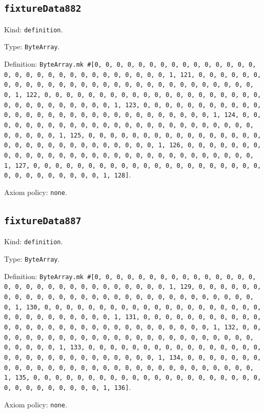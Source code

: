 \documentclass[11pt]{article}
\begin{document}
\subsection*{\texttt{fixtureData882}}
\noindent Kind: \texttt{definition}.\par
\noindent Type: \texttt{ByteArray}.\par
\noindent Definition: \texttt{ByteArray.mk \#[0, 0, 0, 0, 0, 0, 0, 0, 0, 0, 0, 0, 0, 0, 0, 0, 0, 0, 0, 0, 0, 0, 0, 0, 0, 0, 0, 0, 0, 0, 1, 121, 0, 0, 0, 0, 0, 0, 0, 0, 0, 0, 0, 0, 0, 0, 0, 0, 0, 0, 0, 0, 0, 0, 0, 0, 0, 0, 0, 0, 0, 0, 1, 122, 0, 0, 0, 0, 0, 0, 0, 0, 0, 0, 0, 0, 0, 0, 0, 0, 0, 0, 0, 0, 0, 0, 0, 0, 0, 0, 0, 0, 0, 0, 1, 123, 0, 0, 0, 0, 0, 0, 0, 0, 0, 0, 0, 0, 0, 0, 0, 0, 0, 0, 0, 0, 0, 0, 0, 0, 0, 0, 0, 0, 0, 0, 1, 124, 0, 0, 0, 0, 0, 0, 0, 0, 0, 0, 0, 0, 0, 0, 0, 0, 0, 0, 0, 0, 0, 0, 0, 0, 0, 0, 0, 0, 0, 0, 1, 125, 0, 0, 0, 0, 0, 0, 0, 0, 0, 0, 0, 0, 0, 0, 0, 0, 0, 0, 0, 0, 0, 0, 0, 0, 0, 0, 0, 0, 0, 0, 1, 126, 0, 0, 0, 0, 0, 0, 0, 0, 0, 0, 0, 0, 0, 0, 0, 0, 0, 0, 0, 0, 0, 0, 0, 0, 0, 0, 0, 0, 0, 0, 1, 127, 0, 0, 0, 0, 0, 0, 0, 0, 0, 0, 0, 0, 0, 0, 0, 0, 0, 0, 0, 0, 0, 0, 0, 0, 0, 0, 0, 0, 0, 0, 1, 128]}.\par
\noindent Axiom policy: \texttt{none}.\par
\subsection*{\texttt{fixtureData887}}
\noindent Kind: \texttt{definition}.\par
\noindent Type: \texttt{ByteArray}.\par
\noindent Definition: \texttt{ByteArray.mk \#[0, 0, 0, 0, 0, 0, 0, 0, 0, 0, 0, 0, 0, 0, 0, 0, 0, 0, 0, 0, 0, 0, 0, 0, 0, 0, 0, 0, 0, 0, 1, 129, 0, 0, 0, 0, 0, 0, 0, 0, 0, 0, 0, 0, 0, 0, 0, 0, 0, 0, 0, 0, 0, 0, 0, 0, 0, 0, 0, 0, 0, 0, 1, 130, 0, 0, 0, 0, 0, 0, 0, 0, 0, 0, 0, 0, 0, 0, 0, 0, 0, 0, 0, 0, 0, 0, 0, 0, 0, 0, 0, 0, 0, 0, 1, 131, 0, 0, 0, 0, 0, 0, 0, 0, 0, 0, 0, 0, 0, 0, 0, 0, 0, 0, 0, 0, 0, 0, 0, 0, 0, 0, 0, 0, 0, 0, 1, 132, 0, 0, 0, 0, 0, 0, 0, 0, 0, 0, 0, 0, 0, 0, 0, 0, 0, 0, 0, 0, 0, 0, 0, 0, 0, 0, 0, 0, 0, 0, 1, 133, 0, 0, 0, 0, 0, 0, 0, 0, 0, 0, 0, 0, 0, 0, 0, 0, 0, 0, 0, 0, 0, 0, 0, 0, 0, 0, 0, 0, 0, 0, 1, 134, 0, 0, 0, 0, 0, 0, 0, 0, 0, 0, 0, 0, 0, 0, 0, 0, 0, 0, 0, 0, 0, 0, 0, 0, 0, 0, 0, 0, 0, 0, 1, 135, 0, 0, 0, 0, 0, 0, 0, 0, 0, 0, 0, 0, 0, 0, 0, 0, 0, 0, 0, 0, 0, 0, 0, 0, 0, 0, 0, 0, 0, 0, 1, 136]}.\par
\noindent Axiom policy: \texttt{none}.\par
\end{document}
